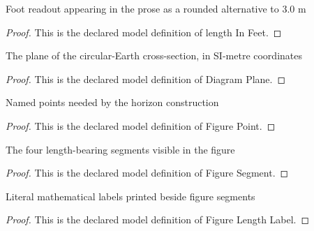 \begin{definition}
  \label{def:physics:phyx-mini-0726:phyxminiproblems-problemphyxmini0726-lengthinfeet}
  Foot readout appearing in the prose as a rounded alternative to 3.0 m
\end{definition}
\begin{proof}
  This is the declared model definition of length In Feet.
\end{proof}
\begin{definition}
  \label{def:physics:phyx-mini-0726:phyxminiproblems-problemphyxmini0726-diagramplane}
  The plane of the circular-Earth cross-section, in SI-metre coordinates
\end{definition}
\begin{proof}
  This is the declared model definition of Diagram Plane.
\end{proof}
\begin{definition}
  \label{def:physics:phyx-mini-0726:phyxminiproblems-problemphyxmini0726-figurepoint}
  Named points needed by the horizon construction
\end{definition}
\begin{proof}
  This is the declared model definition of Figure Point.
\end{proof}
\begin{definition}
  \label{def:physics:phyx-mini-0726:phyxminiproblems-problemphyxmini0726-figuresegment}
  The four length-bearing segments visible in the figure
\end{definition}
\begin{proof}
  This is the declared model definition of Figure Segment.
\end{proof}
\begin{definition}
  \label{def:physics:phyx-mini-0726:phyxminiproblems-problemphyxmini0726-figurelengthlabel}
  Literal mathematical labels printed beside figure segments
\end{definition}
\begin{proof}
  This is the declared model definition of Figure Length Label.
\end{proof}
